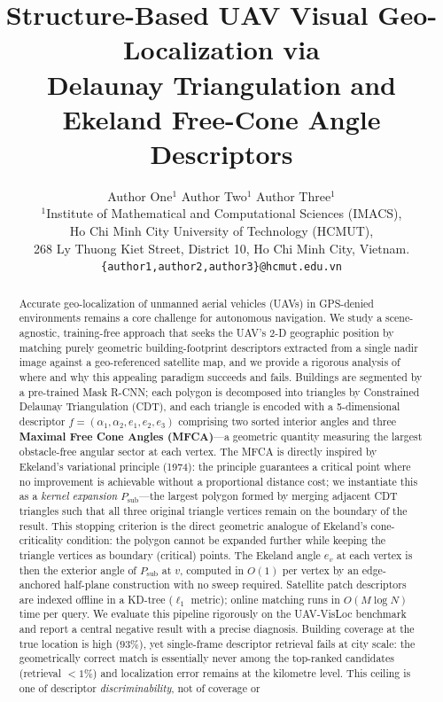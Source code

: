 \documentclass[10pt]{article}
\title{\textbf{Structure-Based UAV Visual Geo-Localization via\\
Delaunay Triangulation and Ekeland Free-Cone Angle Descriptors}}
\author{%
  Author One$^{1}$ \quad Author Two$^{1}$ \quad Author Three$^{1}$\\[4pt]
  $^{1}$Institute of Mathematical and Computational Sciences (IMACS), \\
  Ho Chi Minh City University of Technology (HCMUT), \\
  268 Ly Thuong Kiet Street, District 10, Ho Chi Minh City, Vietnam. \\[2pt]
  \texttt{\{author1,author2,author3\}@hcmut.edu.vn}
}
\date{}
\theoremstyle{plain}
\theoremstyle{definition}
\begin{document}
\maketitle

\begin{abstract}
Accurate geo-localization of unmanned aerial vehicles (UAVs) in GPS-denied
environments remains a core challenge for autonomous navigation.
We study a scene-agnostic, training-free approach that seeks the UAV's 2-D
geographic position by matching purely geometric building-footprint descriptors
extracted from a single nadir image against a geo-referenced satellite map, and
we provide a rigorous analysis of where and why this appealing paradigm
succeeds and fails.
Buildings are segmented by a pre-trained Mask R-CNN; each polygon is
decomposed into triangles by Constrained Delaunay Triangulation (CDT), and
each triangle is encoded with a 5-dimensional descriptor
$f = (\alpha_1,\alpha_2,e_1,e_2,e_3)$ comprising two sorted interior angles
and three \textbf{Maximal Free Cone Angles (MFCA)}---a geometric quantity
measuring the largest obstacle-free angular sector at each vertex.
The MFCA is directly inspired by Ekeland's variational principle (1974):
the principle guarantees a critical point where no improvement is achievable
without a proportional distance cost; we instantiate this as a
\emph{kernel expansion} $P_{\mathrm{sub}}$---the largest polygon formed by
merging adjacent CDT triangles such that all three original triangle vertices
remain on the boundary of the result.
This stopping criterion is the direct geometric analogue of Ekeland's
cone-criticality condition: the polygon cannot be expanded further while
keeping the triangle vertices as boundary (critical) points.
The Ekeland angle $e_v$ at each vertex is then the exterior angle of
$P_{\mathrm{sub}}$ at $v$, computed in $O(1)$ per vertex by an
edge-anchored half-plane construction with no sweep required.
Satellite patch descriptors are indexed offline in a KD-tree ($\ell_1$ metric);
online matching runs in $O(M\log N)$ time per query.
We evaluate this pipeline rigorously on the UAV-VisLoc benchmark and report a
central negative result with a precise diagnosis.
Building coverage at the true location is high ($93\%$), yet single-frame
descriptor retrieval fails at city scale: the geometrically correct match is
essentially never among the top-ranked candidates (retrieval ${<}1\%$) and
localization error remains at the kilometre level.
This ceiling is one of descriptor \emph{discriminability}, not of coverage or

\end{abstract}
\end{document}

